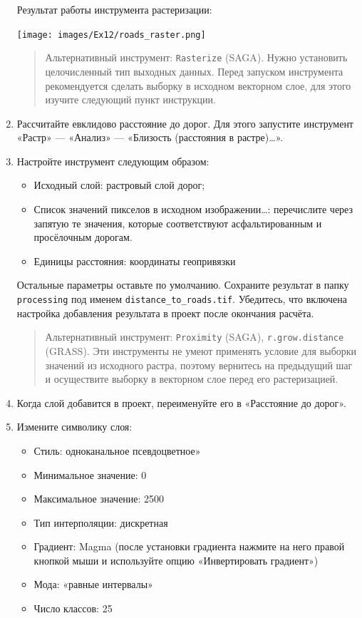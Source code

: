 \documentclass[
  12pt,
]{book}
\providecommand{\tightlist}{%
  \setlength{\itemsep}{0pt}\setlength{\parskip}{0pt}}
\begin{document}
\begin{enumerate}
  Результат работы инструмента растеризации:

  \texttt{[image: images/Ex12/roads\_raster.png]}

  \begin{quote}
  Альтернативный инструмент: \texttt{Rasterize} (SAGA). Нужно установить целочисленный тип выходных данных. Перед запуском инструмента рекомендуется сделать выборку в исходном векторном слое, для этого изучите следующий пункт инструкции.
  \end{quote}
\item
  Рассчитайте евклидово расстояние до дорог. Для этого запустите инструмент «Растр» --- «Анализ» --- «Близость (расстояния в растре)\ldots».
\item
  Настройте инструмент следующим образом:

  \begin{itemize}
  \item
    Исходный слой: растровый слой дорог;
  \item
    Список значений пикселов в исходном изображении\ldots: перечислите через запятую те значения, которые соответствуют асфальтированным и просёлочным дорогам.
  \item
    Единицы расстояния: координаты геопривязки
  \end{itemize}

  Остальные параметры оставьте по умолчанию. Сохраните результат в папку \texttt{processing} под именем \texttt{distance\_to\_roads.tif}. Убедитесь, что включена настройка добавления результата в проект после окончания расчёта.

  \begin{quote}
  Альтернативный инструмент: \texttt{Proximity} (SAGA), \texttt{r.grow.distance} (GRASS). Эти инструменты не умеют применять условие для выборки значений из исходного растра, поэтому вернитесь на предыдущий шаг и осуществите выборку в векторном слое перед его растеризацией.
  \end{quote}
\item
  Когда слой добавится в проект, переименуйте его в «Расстояние до дорог».
\item
  Измените символику слоя:

  \begin{itemize}
  \tightlist
  \item
    Стиль: одноканальное псевдоцветное»
  \item
    Минимальное значение: 0
  \item
    Максимальное значение: 2500
  \item
    Тип интерполяции: дискретная
  \item
    Градиент: Magma (после установки градиента нажмите на него правой кнопкой мыши и используйте опцию «Инвертировать градиент»)
  \item
    Мода: «равные интервалы»
  \item
    Число классов: 25
  \end{itemize}


\end{enumerate}
\end{document}
